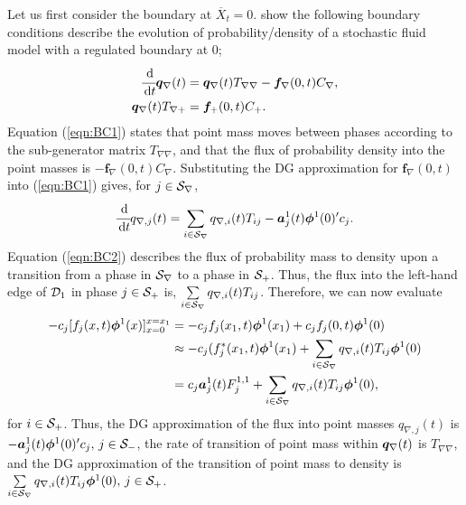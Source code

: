 Let us first consider the boundary at \(\overline X_t=0\). \cite{bo2014} show the following boundary conditions describe the evolution of probability/density of a stochastic fluid model with a regulated boundary at \(0\);
\begin{align}\label{eqn:BC1}
\cfrac{\, \mathrm{d}}{\, \mathrm{d} t}\boldsymbol q_\nabla(t) &= \boldsymbol q_\nabla(t) T_{\nabla \nabla} - \boldsymbol f_\nabla(0,t)C_\nabla,
\\\label{eqn:BC2}
\boldsymbol q_\nabla(t)T_{\nabla+}&=\boldsymbol f_+(0,t)C_+.
\end{align}
Equation (\ref{eqn:BC1}) states that point mass moves between phases according to the sub-generator matrix \(T_{\nabla\nabla}\), and that the flux of probability density into the point masses is \(- \boldsymbol f_\nabla(0,t)C_\nabla\). Substituting the DG approximation for \(\boldsymbol f_\nabla(0,t)\) into (\ref{eqn:BC1}) gives, for \(j\in\mathcal{S}_\nabla\), 
\begin{equation*}\label{eqn:DGBC1}
\cfrac{\, \mathrm{d}}{\, \mathrm{d} t} q_{\nabla,j}(t) = \sum_{i\in\mathcal{S}_\nabla} q_{\nabla,i}(t) T_{i j} - \boldsymbol a^1_j(t)\boldsymbol \phi^1(0)'{}c_j.
\end{equation*}
Equation (\ref{eqn:BC2}) describes the flux of probability mass to density upon a transition from a phase in \(\mathcal{S}_\nabla\) to a phase in \(\mathcal{S}_+\). Thus, the flux into the left-hand edge of \(\mathcal{D}_1\) in phase \(j\in\mathcal{S}_+\) is, \(\sum\limits_{i\in\mathcal{S}_\nabla} q_{\nabla,i}(t)T_{ij}\). Therefore, we can now evaluate 
\begin{align*}
	-c_j[f_j(x,t)\boldsymbol\phi^1(x)]_{x=0}^{x=x_{1}} & =  -c_jf_j(x_1,t)\boldsymbol\phi^1(x_1)+c_jf_j(0,t)\boldsymbol\phi^1(0)
	\\& \approx -c_j(f_j^*(x_1,t)\boldsymbol\phi^1(x_1)+\sum_{i\in\mathcal{S}_\nabla}q_{\nabla,i}(t)T_{ij}\boldsymbol\phi^1(0)
	\\& = c_j\boldsymbol a_j^{1}(t)F_j^{1,1}+\sum_{i\in\mathcal{S}_\nabla}q_{\nabla,i}(t)T_{ij}\boldsymbol\phi^1(0),
\end{align*}
for \(i \in \mathcal{S}_+\). 
Thus, the DG approximation of the flux into point masses \(q_{\nabla,j}(t)\) is \(-\boldsymbol a_j^1(t)\boldsymbol \phi^1(0)'{} c_j,\,j\in\mathcal{S}_-\), the rate of transition of point mass within \(\boldsymbol q_{\nabla}(t)\) is \(T_{\nabla\nabla}\), and the DG approximation of the transition of point mass to density is \(\sum\limits_{i\in\mathcal{S}_\nabla}q_{\nabla,i}(t)T_{ij}\boldsymbol\phi^1(0),\,j\in\mathcal{S}_+\). 

